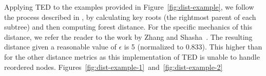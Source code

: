 Applying TED to the examples provided in Figure~\ref{fig:dist-example}, we follow the process described in \cite{Zhang_Shasha_1989}, by calculating key roots (the rightmost parent of each subtree) and then computing forest distance. For the specific mechanics of this distance, we refer the reader to the work by Zhang and Shasha~\cite{Zhang_Shasha_1989}. The resulting distance given a reasonable value of $\epsilon$ is 5 (normalized to 0.833). This higher than for the other distance metrics as this implementation of TED is unable to handle reordered nodes.
Figures~\ref{fig:dist-example-1}~and~\ref{fig:dist-example-2}










